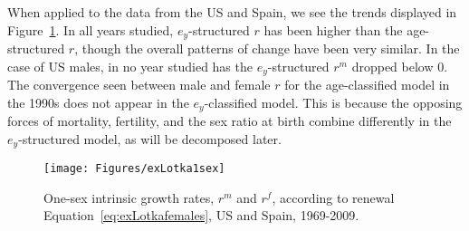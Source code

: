   \FloatBarrier
 When applied to the data from the US and Spain, we see the trends
displayed in Figure~\ref{fig:rex1sex}. In all years studied, $e_y$-structured
$r$ has been higher than the age-structured $r$, though the overall patterns of
change have been very similar. In the case of US males, in no year studied
has the $e_y$-structured $r^m$ dropped below 0. The convergence seen between
male and female $r$ for the age-classified model in the 1990s does not appear in
the $e_y$-classified model. This is because the opposing forces of mortality,
fertility, and the sex ratio at birth combine differently in the
$e_y$-structured model, as will be decomposed later.

\begin{figure}[!ht]
  \centering
    \caption{One-sex intrinsic growth rates, $r^m$ and $r^f$, according to
    renewal Equation~\eqref{eq:exLotkafemales}, US and Spain, 1969-2009.}
     \texttt{[image: Figures/exLotka1sex]}
     \label{fig:rex1sex}
\end{figure}

 \FloatBarrier

